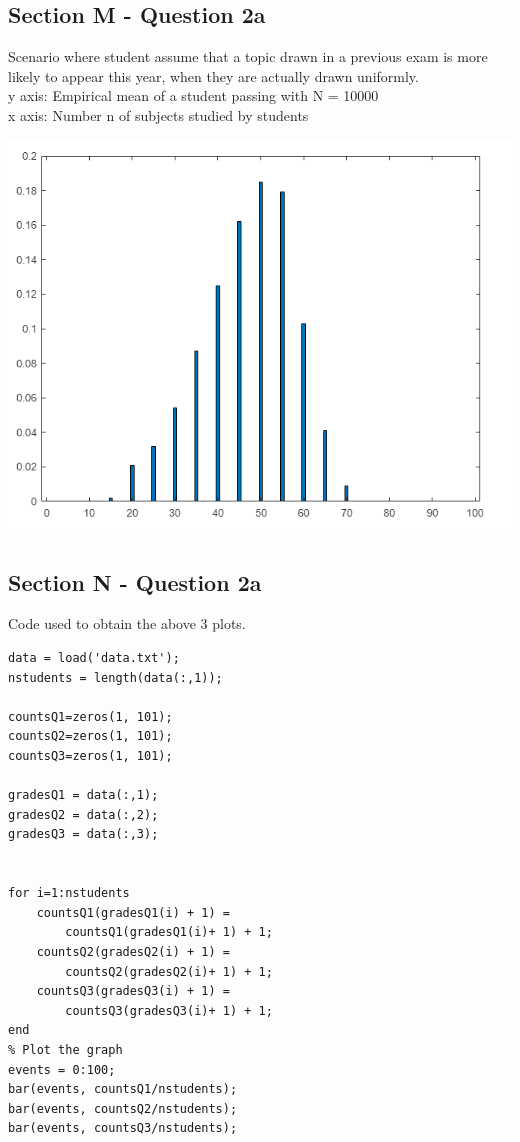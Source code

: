 \documentclass{article}
\begin{document}
\subsection*{Section M - Question 2a}
Scenario where student assume that a topic drawn in a previous exam is more likely
to appear this year, when they are actually drawn uniformly.\\
y axis: Empirical mean of a student passing with N = 10000 \\
x axis: Number n of subjects studied by students
\begin{center}
    \includegraphics[scale=0.5]{q2_c}
\end{center}


\subsection*{Section N - Question 2a}
Code used to obtain the above 3 plots.\\
\begin{lstlisting}
data = load('data.txt');
nstudents = length(data(:,1));

countsQ1=zeros(1, 101);
countsQ2=zeros(1, 101);
countsQ3=zeros(1, 101);

gradesQ1 = data(:,1);
gradesQ2 = data(:,2);
gradesQ3 = data(:,3);


for i=1:nstudents
    countsQ1(gradesQ1(i) + 1) = 
        countsQ1(gradesQ1(i)+ 1) + 1; 
    countsQ2(gradesQ2(i) + 1) = 
        countsQ2(gradesQ2(i)+ 1) + 1; 
    countsQ3(gradesQ3(i) + 1) = 
        countsQ3(gradesQ3(i)+ 1) + 1; 
end
% Plot the graph
events = 0:100;
bar(events, countsQ1/nstudents);
bar(events, countsQ2/nstudents);
bar(events, countsQ3/nstudents);
\end{lstlisting}
\end{document}
